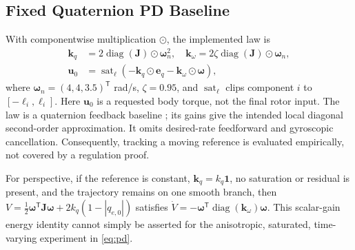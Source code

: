 \documentclass[letterpaper,10pt,conference]{IEEEtran}
\newcommand{\T}{^{\mathsf T}}
\newcommand{\sat}{\operatorname{sat}}
\begin{document}
\subsection{Fixed Quaternion PD Baseline}
With componentwise multiplication $\odot$, the implemented law is
\begin{align}
 \bm k_q&=2\operatorname{diag}(\bm J)\odot\bm\omega_n^2,\quad
 \bm k_\omega=2\zeta\operatorname{diag}(\bm J)\odot\bm\omega_n,\\
 \bm u_0&=\sat_{\bm\ell}
       (-\bm k_q\odot\bm e_q-\bm k_\omega\odot\bm\omega),
 \label{eq:pd}
\end{align}
where $\bm\omega_n=(4,4,3.5)\T$ rad/s, $\zeta=0.95$, and
$\sat_{\bm\ell}$ clips component $i$ to $[-\ell_i,\ell_i]$.
Here $\bm u_0$ is a requested body torque, not the final rotor input.
The law is a quaternion feedback baseline \cite{fresk2013quaternion}; its
gains give the intended local diagonal second-order approximation.
It omits desired-rate feedforward and gyroscopic cancellation. Consequently,
tracking a moving reference is evaluated empirically, not covered by a
regulation proof.

For perspective, if the reference is constant, $\bm k_q=k_q\bm1$,
no saturation or residual is present, and the trajectory remains on one
smooth branch, then
$V=\frac12\bm\omega\T\bm J\bm\omega+2k_q(1-|q_{e,0}|)$ satisfies
$\dot V=-\bm\omega\T\operatorname{diag}(\bm k_\omega)\bm\omega$.
This scalar-gain energy identity cannot simply be asserted for the
anisotropic, saturated, time-varying experiment in \eqref{eq:pd}.
\end{document}
